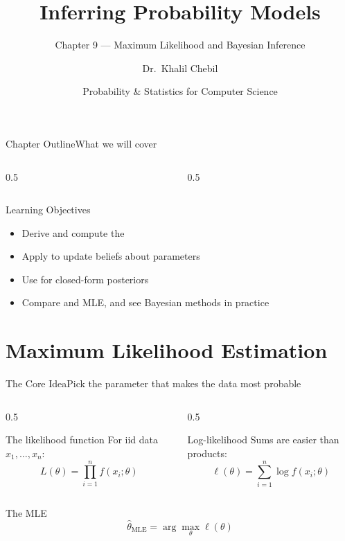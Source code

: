 \documentclass[aspectratio=169,11pt]{beamer}
\title[Ch.\,9 — Inferring Models]{Inferring Probability Models}
\subtitle{Chapter 9 — Maximum Likelihood and Bayesian Inference}
\author{Dr.\ Khalil Chebil}
\date{Probability \& Statistics for Computer Science}
\begin{document}
{
\begin{frame}
  \titlepage
\end{frame}}

\begin{frame}{Chapter Outline}{What we will cover}
  \begin{columns}[T]
    \begin{column}{0.5\textwidth}
      \tableofcontents[sections={1-4}]
    \end{column}
    \begin{column}{0.5\textwidth}
      \tableofcontents[sections={5-8}]
    \end{column}
  \end{columns}
  \vfill
  \begin{block}{Learning Objectives}
    \begin{itemize}
      \item Derive and compute the 
      \item Apply  to update beliefs about parameters
      \item Use  for closed-form posteriors
      \item Compare  and MLE, and see Bayesian methods in practice
    \end{itemize}
  \end{block}
\end{frame}

\section{Maximum Likelihood Estimation}

\begin{frame}{The Core Idea}{Pick the parameter that makes the data most probable}
  \begin{columns}[T]
    \begin{column}{0.5\textwidth}
      \begin{block}{The likelihood function}
        \small For iid data $x_1,\dots,x_n$:
        \[ L(\theta) = \prod_{i=1}^n f(x_i;\theta) \]
      \end{block}
    \end{column}
    \begin{column}{0.5\textwidth}
      \begin{exampleblock}{Log-likelihood}
        \small Sums are easier than products:
        \[ \ell(\theta) = \sum_{i=1}^n \log f(x_i;\theta) \]
      \end{exampleblock}
    \end{column}
  \end{columns}
  \vfill
  \begin{block}{The MLE}
    \[ \hat\theta_{\text{MLE}} = \arg\max_\theta \ell(\theta) \]
  \end{block}
\end{frame}
\end{document}
